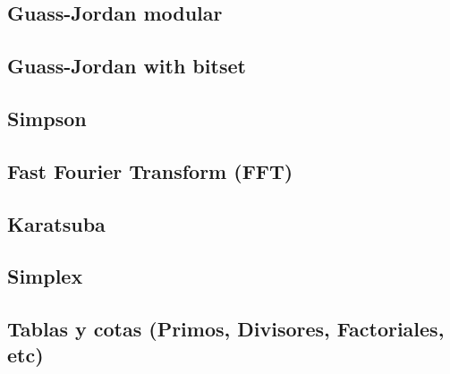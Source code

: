 \subsection{Guass-Jordan modular}

\newpage
\subsection{Guass-Jordan with bitset}


\subsection{Simpson}


\newpage
\subsection{Fast Fourier Transform (FFT)}


\subsection{Karatsuba}


\newpage
\subsection{Simplex}


\subsection{Tablas y cotas (Primos, Divisores, Factoriales, etc)}
